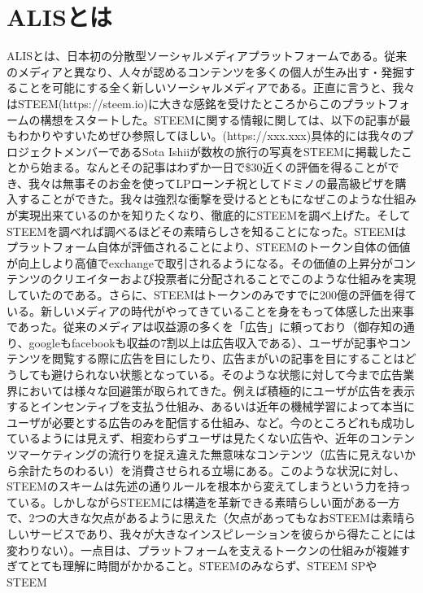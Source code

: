 \documentclass{jsarticle}
\begin{document}
\section{ALISとは}
ALISとは、日本初の分散型ソーシャルメディアプラットフォームである。従来のメディアと異なり、人々が認めるコンテンツを多くの個人が生み出す・発掘することを可能にする全く新しいソーシャルメディアである。正直に言うと、我々はSTEEM(https://steem.io)に大きな感銘を受けたところからこのプラットフォームの構想をスタートした。STEEMに関する情報に関しては、以下の記事が最もわかりやすいためぜひ参照してほしい。(https://xxx.xxx)具体的には我々のプロジェクトメンバーであるSota Ishiiが数枚の旅行の写真をSTEEMに掲載したことから始まる。なんとその記事はわずか一日で\$30近くの評価を得ることができ、我々は無事そのお金を使ってLPローンチ祝としてドミノの最高級ピザを購入することができた。我々は強烈な衝撃を受けるとともになぜこのような仕組みが実現出来ているのかを知りたくなり、徹底的にSTEEMを調べ上げた。そしてSTEEMを調べれば調べるほどその素晴らしさを知ることになった。STEEMはプラットフォーム自体が評価されることにより、STEEMのトークン自体の価値が向上しより高値でexchangeで取引されるようになる。その価値の上昇分がコンテンツのクリエイターおよび投票者に分配されることでこのような仕組みを実現していたのである。さらに、STEEMはトークンのみですでに200億の評価を得ている。新しいメディアの時代がやってきていることを身をもって体感した出来事であった。従来のメディアは収益源の多くを「広告」に頼っており（御存知の通り、googleもfacebookも収益の7割以上は広告収入である）、ユーザが記事やコンテンツを閲覧する際に広告を目にしたり、広告まがいの記事を目にすることはどうしても避けられない状態となっている。そのような状態に対して今まで広告業界においては様々な回避策が取られてきた。例えば積極的にユーザが広告を表示するとインセンティブを支払う仕組み、あるいは近年の機械学習によって本当にユーザが必要とする広告のみを配信する仕組み、など。今のところどれも成功しているようには見えず、相変わらずユーザは見たくない広告や、近年のコンテンツマーケティングの流行りを捉え違えた無意味なコンテンツ（広告に見えないから余計たちのわるい）を消費させられる立場にある。このような状況に対し、STEEMのスキームは先述の通りルールを根本から変えてしまうという力を持っている。しかしながらSTEEMには構造を革新できる素晴らしい面がある一方で、2つの大きな欠点があるように思えた（欠点があってもなおSTEEMは素晴らしいサービスであり、我々が大きなインスピレーションを彼らから得たことには変わりない）。一点目は、プラットフォームを支えるトークンの仕組みが複雑すぎてとても理解に時間がかかること。STEEMのみならず、STEEM SPやSTEEM 
\end{document}
